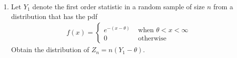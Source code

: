 \renewcommand{\theequation}{\theenumi}
\renewcommand{\thefigure}{\theenumi}
\renewcommand{\thetable}{\theenumi}
\begin{enumerate}[label=\thesection.\arabic*.,ref=\thesection.\theenumi]



\item Let $Y_1$ denote the first order statistic in a random sample of size $n$ from a distribution that has the pdf 
\begin{align}
    f(x) = 
    \begin{cases}
    e^{-(x-\theta)}&\text{ when } \theta<x<\infty\\
    0 &\text{  otherwise} 
    \end{cases}
\end{align}
Obtain the distribution of $Z_n = n(Y_1 - \theta)$.
%
\\
\solution


\end{enumerate}